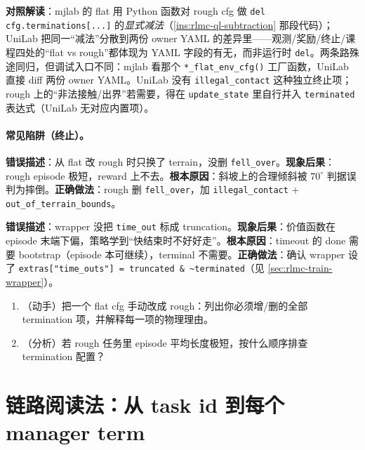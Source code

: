 \textbf{对照解读}：mjlab 的 flat 用 Python 函数对 rough cfg 做 \verb|del cfg.terminations[...]| 的\emph{显式减法}（\cref{ins:rlmc-ql-subtraction} 那段代码）；UniLab 把同一“减法”分散到两份 owner YAML 的差异里——观测/奖励/终止/课程四处的“flat vs rough”都体现为 YAML 字段的有无，而非运行时 \verb|del|。两条路殊途同归，但调试入口不同：mjlab 看那个 \verb|*_flat_env_cfg()| 工厂函数，UniLab 直接 diff 两份 owner YAML。UniLab 没有 \verb|illegal_contact| 这种独立终止项；rough 上的“非法接触/出界”若需要，得在 \verb|update_state| 里自行并入 \verb|terminated| 表达式（UniLab 无对应内置项）。

\paragraph{常见陷阱（终止）。}

\begin{pitfall}
\textbf{错误描述}：从 flat 改 rough 时只换了 terrain，没删 \verb|fell_over|。\textbf{现象后果}：rough episode 极短，reward 上不去。\textbf{根本原因}：斜坡上的合理倾斜被 $70^\circ$ 判据误判为摔倒。\textbf{正确做法}：rough 删 \verb|fell_over|，加 \verb|illegal_contact| + \verb|out_of_terrain_bounds|。
\end{pitfall}

\begin{pitfall}
\textbf{错误描述}：wrapper 没把 \verb|time_out| 标成 truncation。\textbf{现象后果}：价值函数在 episode 末端下偏，策略学到“快结束时不好好走”。\textbf{根本原因}：timeout 的 done 需要 bootstrap（episode 本可继续），terminal 不需要。\textbf{正确做法}：确认 wrapper 设了 \verb|extras["time_outs"] = truncated & ~terminated|（见 \cref{sec:rlmc-train-wrapper}）。
\end{pitfall}

\begin{practice}[终止设计]
\begin{enumerate}
\item （动手）把一个 flat cfg 手动改成 rough：列出你必须增/删的全部 termination 项，并解释每一项的物理理由。
\item （分析）若 rough 任务里 episode 平均长度极短，按什么顺序排查 termination 配置？
\end{enumerate}
\end{practice}

\section{链路阅读法：从 task id 到每个 manager term}
\label{sec:rlmc-ql-readpath}

